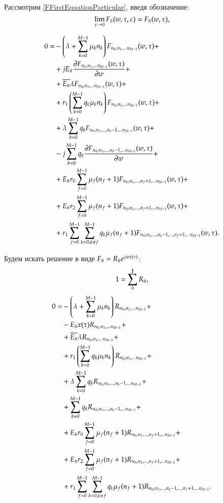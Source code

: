 Рассмотрим \eqref{FFirstEquationParticular}, введя обозначение:
\[\lim_{\varepsilon \to 0} {F}_{\bar{n}}(w, \tau, \varepsilon) =
    {F}_{\bar{n}}(w, \tau),\]

\begin{equation}\begin{aligned}
\label{FLimitEquationParticular}
0=
    &-\left( {\lambda+\sum_{{k}=0}^{M-1}\mu_{k}{n}_{k}} \right){F}_{{n}_0, {n}_1, ... {n}_{M-1}}(w,\tau)+\\
    &+j E_{\bar{n}} \pdv{ {F}_{{n}_0, {n}_1, ... {n}_{M-1}} (w,\tau)}{w}(i,\tau) + \\
    &+\overline{E_{\bar{n}}} \lambda {F}_{{n}_0, {n}_1, ... {n}_{M-1}}(w,\tau)+\\
    &+r_1 \left( {\sum_{{k}=0}^{M-1} q_{k}\mu_{k}{n}_{k}} \right) {F}_{{n}_0, {n}_1, ... {n}_{M-1}}(w,\tau) + \\
    &+\lambda\sum_{k=0}^{M-1}q_k {F}_{{n}_0, {n}_1, ... , {n}_{k} - 1, ... {n}_{M-1}}(w,\tau) + \\
    &-j\sum_{k=0}^{M-1}q_k \pdv{ {F}_{{n}_0, {n}_1, ... , {n}_{k} - 1, ... {n}_{M-1}} (w,\tau)}{w} + \\
    &+E_{\bar{n}} r_0 \sum_{f=0}^{M-1} \mu_f (n_f + 1) {F}_{{n}_0, {n}_1, ... , {n}_{f} + 1, ... {n}_{M-1}}(w,\tau) + \\
    &+E_{\bar{n}} r_2 \sum_{f=0}^{M-1} \mu_f (n_f + 1) {F}_{{n}_0, {n}_1, ... , {n}_{f} + 1, ... {n}_{M-1}}(w,\tau) + \\
    &+r_1 \sum_{{f}=0}^{M-1} \sum_{{k}=0, {k} \neq {f}}^{M-1}
        q_k \mu_f (n_f+1) {F}_{{n}_0, {n}_1, ... , {n}_{k} - 1, ... , {n}_{f} + 1, ... {n}_{M-1}}(w,\tau).
\end{aligned}\end{equation}

Будем искать решение в виде \({F}_{\bar{n}} = R_{\bar{n}} e^{jwx(\tau)}\):
\begin{equation} \label{RSumEqualsToOne}
    1 = \sum_{\bar{n}}^{\mathbb{J}}R_{\bar{n}},
\end{equation}
\begin{equation}\begin{aligned} \label{RFirstEverParticular}
0=
    &-\left( {\lambda+\sum_{{k}=0}^{M-1}\mu_{k}{n}_{k}} \right){R}_{{n}_0, {n}_1, ... {n}_{M-1}}+\\
    &-E_{\bar{n}} x(\tau) {R}_{{n}_0, {n}_1, ... {n}_{M-1}} + \\
    &+\overline{E_{\bar{n}}} \lambda {R}_{{n}_0, {n}_1, ... {n}_{M-1}} +\\
    &+r_1 \left( {\sum_{{k}=0}^{M-1} q_{k}\mu_{k}{n}_{k}} \right) {R}_{{n}_0, {n}_1, ... {n}_{M-1}} + \\
    &+\lambda\sum_{k=0}^{M-1}q_k {R}_{{n}_0, {n}_1, ... , {n}_{k} - 1, ... {n}_{M-1}} + \\
    &+\sum_{k=0}^{M-1}q_k {R}_{{n}_0, {n}_1, ... , {n}_{k} - 1, ... {n}_{M-1}} + \\
    &+E_{\bar{n}} r_0 \sum_{f=0}^{M-1} \mu_f (n_f + 1) {R}_{{n}_0, {n}_1, ... , {n}_{f} + 1, ... {n}_{M-1}} + \\
    &+E_{\bar{n}} r_2 \sum_{f=0}^{M-1} \mu_f (n_f + 1) {R}_{{n}_0, {n}_1, ... , {n}_{f} + 1, ... {n}_{M-1}} + \\
    &+r_1 \sum_{{f}=0}^{M-1} \sum_{{k}=0, {k} \neq {f}}^{M-1}
        q_k \mu_f (n_f+1) {R}_{{n}_0, {n}_1, ... , {n}_{k} - 1, ... , {n}_{f} + 1, ... {n}_{M-1}}.
\end{aligned}\end{equation}

